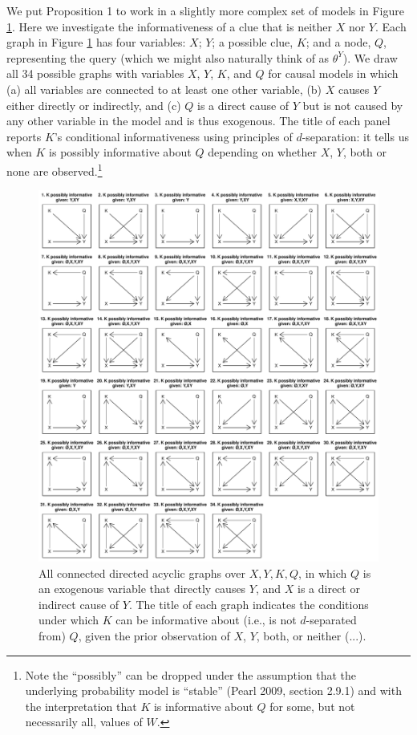 \documentclass[
  12pt,
]{book}
\begin{document}
We put Proposition 1 to work in a slightly more complex set of models in Figure \ref{fig:34graphs}. Here we investigate the informativeness of a clue that is neither \(X\) nor \(Y\). Each graph in Figure \ref{fig:34graphs} has four variables: \(X\); \(Y\); a possible clue, \(K\); and a node, \(Q\), representing the query (which we might also naturally think of as \(\theta^Y\)). We draw all 34 possible graphs with variables \(X\), \(Y\), \(K\), and \(Q\) for causal models in which (a) all variables are connected to at least one other variable, (b) \(X\) causes \(Y\) either directly or indirectly, and (c) \(Q\) is a direct cause of \(Y\) but is not caused by any other variable in the model and is thus exogenous. The title of each panel reports \(K\)'s conditional informativeness using principles of \(d\)-separation: it tells us when \(K\) is possibly informative about \(Q\) depending on whether \(X\), \(Y\), both or none are observed.\footnote{Note the ``possibly'' can be dropped under the assumption that the underlying probability model is ``stable'' (Pearl 2009, section 2.9.1) and with the interpretation that \(K\) is informative about \(Q\) for some, but not necessarily all, values of \(W\).}

\begin{figure}

{\centering \includegraphics{ii_files/figure-latex/34graphs-1} 

}

\caption{All connected directed acyclic graphs over $X,Y,K,Q$, in which $Q$ is an exogenous variable that directly causes $Y$, and $X$ is a direct or indirect cause of $Y$. The title of each graph indicates the conditions under which $K$ can be informative about (i.e., is not $d$-separated from) $Q$, given the prior observation of $X$, $Y$, both, or neither (...).}\label{fig:34graphs}
\end{figure}
\end{document}
